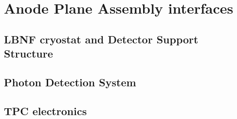 \chapter{Anode Plane Assembly interfaces}
\label{ch:fdsp-apa-intfc}

\section{LBNF cryostat and Detector Support Structure}
\label{sec:fdsp-apa-intfc-lbnf-dss}


\section{Photon Detection System}
\label{sec:fdsp-apa-intfc-pds}


\section{TPC electronics}
\label{sec:fdsp-apa-intfc-elec}




